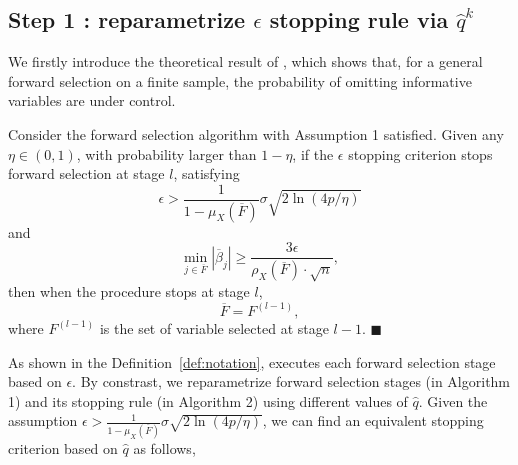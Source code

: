 \documentclass[11pt,review,authoryear]{elsarticle}
\begin{document}
\begin{appendices}

\subsection*{Step 1 : reparametrize $\epsilon$ stopping rule via $\widehat{q}^k$ }

We firstly introduce the theoretical result of \citet[Theorem 1]{zhang09}, which shows that, for a general forward selection on a finite sample, the probability of omitting informative variables are under control. 
%
\begin{theorem}
  \citep{zhang09} Consider the forward selection algorithm with Assumption 1 satisfied. Given any $\eta \in \left( 0, 1 \right)$, with probability larger than $1 - \eta$, if the $\epsilon$  stopping criterion stops forward selection at stage $l$, satisfying
  \begin{equation}
    \epsilon>\frac{1}{1-\mu_X \left( \overline{F} \right)} \sigma\sqrt{ 2 \ln \left( 4p / \eta \right)}
  \end{equation}
  and
  \begin{equation}
    \min_{j\in\overline{F}}\left|\overline{\beta}_{j}\right|\geqslant\frac{3\epsilon}{\rho_{X}\left(\overline{F}\right)\cdot\sqrt{n}}, \label{thm0}
  \end{equation}
  then when the procedure stops at stage $l$, 
  \begin{equation}
    \overline{F}=F^{\left(l-1\right)}, \nonumber
  \end{equation}
  where $F^{\left(l-1\right)}$ is the set of variable selected at stage $l-1$. $\blacksquare$
\end{theorem}

As shown in the Definition~\ref{def:notation}, \citet{zhang09} executes each forward selection stage based on $\epsilon$. By constrast, we reparametrize forward selection stages (in Algorithm 1) and its stopping rule (in Algorithm 2) using different values of $\widehat{q}$. Given the assumption $\epsilon > \frac{1}{1-\mu_X \left( \overline{F} \right)} \sigma\sqrt{ 2 \ln \left( 4p / \eta \right)}$, we can find an equivalent stopping criterion based on $\widehat{q}$ as follows, 


\end{appendices}
\end{document}
